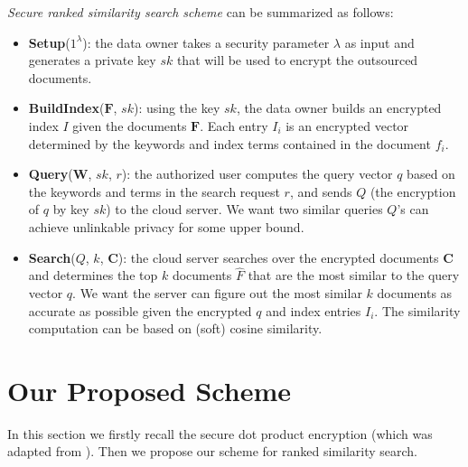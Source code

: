 \documentclass{IEEEtran}
\begin{document}
\emph{Secure ranked similarity search scheme} can be summarized as follows:
\begin{itemize}
\item \textbf{Setup}($1^\lambda$): the data owner takes a security parameter $\lambda$ as input and generates a private key $sk$ that will be used to encrypt the outsourced documents.
\item \textbf{BuildIndex}($\mathbf{F}$, $sk$): using the key $sk$, the data owner builds an encrypted index $I$ given the documents $\mathbf{F}$. Each entry $I_i$ is an encrypted vector determined by the keywords and index terms contained in the document $f_i$.
\item \textbf{Query}($\mathbf{W}$, $sk$, $r$): the authorized user computes the query vector $q$ based on the keywords and terms in the search request $r$, and sends $Q$ (the encryption of $q$ by key $sk$) to the cloud server. We want two similar queries $Q$'s can achieve unlinkable privacy for some upper bound.
\item \textbf{Search}($Q$, $k$, $\mathbf{C}$): the cloud server searches over the encrypted documents $\mathbf{C}$ and determines the top $k$ documents $\hat{F}$ that are the most similar to the query vector $q$. We want the server can figure out the most similar $k$ documents as accurate as possible given the encrypted $q$ and index entries $I_i$. The similarity computation can be based on (soft) cosine similarity.
\end{itemize}

\section{Our Proposed Scheme}
In this section we firstly recall the secure dot product encryption \cite{Cao14} (which was adapted from \cite{Wong09}). Then we propose our scheme for ranked similarity search.
\end{document}
